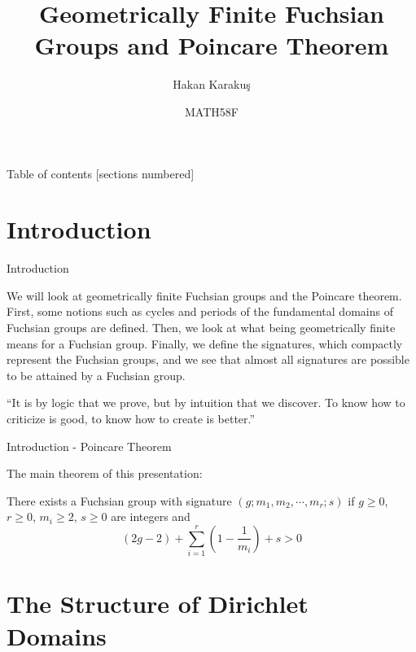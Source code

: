 \documentclass[
	american,
	sections numbered,
	usenames,
	xcolor=dvipsnames,
	aspectratio=169,
]{beamer}
\title{Geometrically Finite Fuchsian Groups and Poincare Theorem}
\author{Hakan Karakuş}
\date{MATH58F}
\theoremstyle{plain}%
\begin{document}
\begin{frame}[plain]
	\titlepage
\end{frame}

% 

\begin{frame}{Table of contents}
	[sections numbered]
	\tableofcontents%
\end{frame}

\section{Introduction}

\begin{frame}{Introduction}

    We will look at geometrically finite Fuchsian groups and the Poincare theorem. First, some notions such as cycles and periods of the fundamental domains of Fuchsian groups are defined. Then, we look at what being geometrically finite means for a Fuchsian group. Finally, we define the signatures, which compactly represent the Fuchsian groups, and we see that almost all signatures are possible to be attained by a Fuchsian group.

	\begin{exampleblock}{}
	  {\large ``It is by logic that we prove, but by intuition that we discover. To know how to criticize is good, to know how to create is better.''}
	  \vskip3mm
	  \hspace*{}
	\end{exampleblock}

\end{frame}

\begin{frame}{Introduction - Poincare Theorem}

    The main theorem of this presentation:

	\begin{theorem}[Poincare]
        There exists a Fuchsian group with signature $(g;m_1,m_2,\cdots,m_r;s)$ if $g\geq 0$, $r\geq 0$, $m_i\geq 2$, $s\geq 0$ are integers and $$(2g-2)+\sum_{i=1}^r\left(1-\frac{1}{m_i}\right)+s>0$$
    \end{theorem}

\end{frame}

\section{The Structure of Dirichlet Domains}
\end{document}
